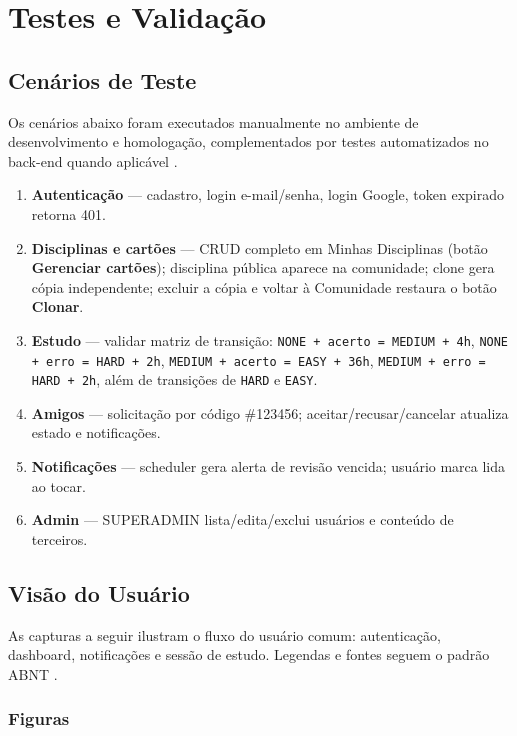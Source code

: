 \chapter{Testes e Validação}
\label{cap:testes}

\section{Cenários de Teste}

Os cenários abaixo foram executados manualmente no ambiente de desenvolvimento e homologação, complementados por testes automatizados no back-end quando aplicável \cite{junit5_spring}.

\begin{enumerate}
    \item \textbf{Autenticação} --- cadastro, login e-mail/senha, login Google, token expirado retorna 401.
    \item \textbf{Disciplinas e cartões} --- CRUD completo em Minhas Disciplinas (botão \textbf{Gerenciar cartões}); disciplina pública aparece na comunidade; clone gera cópia independente; excluir a cópia e voltar à Comunidade restaura o botão \textbf{Clonar}.
    \item \textbf{Estudo} --- validar matriz de transição: \texttt{NONE + acerto = MEDIUM + 4h}, \texttt{NONE + erro = HARD + 2h}, \texttt{MEDIUM + acerto = EASY + 36h}, \texttt{MEDIUM + erro = HARD + 2h}, além de transições de \texttt{HARD} e \texttt{EASY}.
    \item \textbf{Amigos} --- solicitação por código \#123456; aceitar/recusar/cancelar atualiza estado e notificações.
    \item \textbf{Notificações} --- scheduler gera alerta de revisão vencida; usuário marca lida ao tocar.
    \item \textbf{Admin} --- SUPERADMIN lista/edita/exclui usuários e conteúdo de terceiros.
\end{enumerate}

\section{Visão do Usuário}

As capturas a seguir ilustram o fluxo do usuário comum: autenticação, dashboard, notificações e sessão de estudo. Legendas e fontes seguem o padrão ABNT \cite{abnt_nbr14724}.

\subsection{Figuras}

